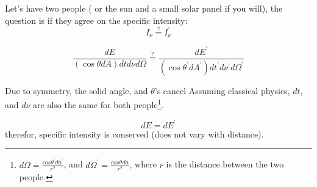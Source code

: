 Let's have two people ( or the sun and a small solar panel if you will), the question is if they agree on the specific intensity:
\begin{equation}
    I_\nu \stackrel{?}{=} I_{\nu}^{'}
\end{equation}

\begin{equation}
    \frac{dE}{(\cos\theta dA)dtd\nu d\Omega} \stackrel{?}{=} \frac{dE^{'}}{(\cos\theta^{'} dA^{'})dt^{'}d\nu^{'} d\Omega^{'}}
\end{equation}

Due to symmetry, the solid angle, and $\theta$'s cancel Assuming classical physics, $dt$, and $d\nu$ are also the same for both people\footnote{$d\Omega = \frac{cos\theta^{'}da^{'}}{r^2}$, and  $d\Omega^{'} = \frac{cos\theta^{}da^{}}{r^2}$, where $r$ is the distance between the two people.}. 

\begin{equation}
    \boxed{dE = dE^{'}}
\end{equation}
therefor, specific intensity is conserved (does not vary with distance). 